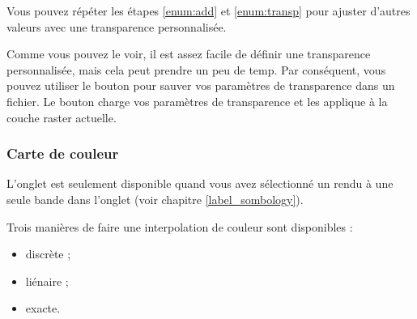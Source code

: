 Vous pouvez répéter les étapes \ref{enum:add} et \ref{enum:transp} pour ajuster
d'autres valeurs avec une transparence personnalisée. 

Comme vous pouvez le voir, il est assez facile de définir une transparence
personnalisée, mais cela peut prendre un peu de temp. Par conséquent, vous
pouvez utiliser le bouton  pour sauver vos paramètres  de transparence dans un fichier. Le
bouton  
charge vos paramètres de transparence et les applique à la couche raster actuelle.

 \subsubsection{Carte de couleur} \label{label_colormaptab}

L'onglet  est seulement disponible quand vous avez sélectionné un
rendu à une seule bande dans l'onglet   (voir chapitre
\ref{label_sombology}).

Trois manières de faire une interpolation de couleur sont disponibles :
\begin{itemize}
\item discrète ;
\item liénaire ;
\item exacte.
\end{itemize}

